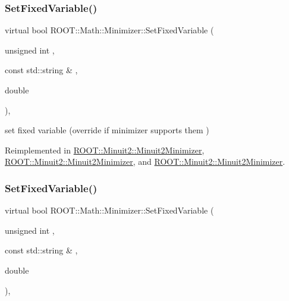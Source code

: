 \subsubsection{\texorpdfstring{SetFixedVariable()}{SetFixedVariable()}\hspace{0.1cm}{\footnotesize\ttfamily [2/3]}}
{\footnotesize\ttfamily virtual bool R\+O\+O\+T\+::\+Math\+::\+Minimizer\+::\+Set\+Fixed\+Variable (\begin{DoxyParamCaption}\item[{unsigned int}]{,  }\item[{const std\+::string \&}]{,  }\item[{double}]{ }\end{DoxyParamCaption})\hspace{0.3cm}{\ttfamily [inline]}, {\ttfamily [virtual]}}



set fixed variable (override if minimizer supports them ) 



Reimplemented in \mbox{\hyperlink{classROOT_1_1Minuit2_1_1Minuit2Minimizer_af42341b80ebb02d8c0882beaa781e7bd}{R\+O\+O\+T\+::\+Minuit2\+::\+Minuit2\+Minimizer}}, \mbox{\hyperlink{classROOT_1_1Minuit2_1_1Minuit2Minimizer_af42341b80ebb02d8c0882beaa781e7bd}{R\+O\+O\+T\+::\+Minuit2\+::\+Minuit2\+Minimizer}}, and \mbox{\hyperlink{classROOT_1_1Minuit2_1_1Minuit2Minimizer_af42341b80ebb02d8c0882beaa781e7bd}{R\+O\+O\+T\+::\+Minuit2\+::\+Minuit2\+Minimizer}}.

\mbox{\label{classROOT_1_1Math_1_1Minimizer_a063e9d83c8a61afc8798ebb1d74b6f2b}} 
\subsubsection{\texorpdfstring{SetFixedVariable()}{SetFixedVariable()}\hspace{0.1cm}{\footnotesize\ttfamily [3/3]}}
{\footnotesize\ttfamily virtual bool R\+O\+O\+T\+::\+Math\+::\+Minimizer\+::\+Set\+Fixed\+Variable (\begin{DoxyParamCaption}\item[{unsigned int}]{,  }\item[{const std\+::string \&}]{,  }\item[{double}]{ }\end{DoxyParamCaption})\hspace{0.3cm}{\ttfamily [inline]}, {\ttfamily [virtual]}}



